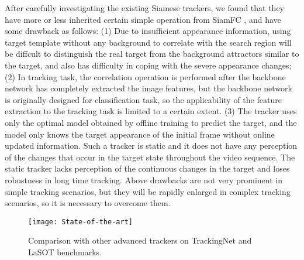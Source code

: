 \documentclass[letterpaper]{article} \usepackage{aaai23}  \usepackage{times}  \usepackage{helvet}  \usepackage{courier}  \usepackage[hyphens]{url}  \usepackage{graphicx} \urlstyle{rm} \def\UrlFont{\rm}  \usepackage{natbib}  \usepackage{caption} \frenchspacing  \setlength{\pdfpagewidth}{8.5in}  \setlength{\pdfpageheight}{11in}  \usepackage{algorithm}
\begin{document}
After carefully investigating the existing Siamese trackers, we found that they have more or less inherited certain simple operation from SiamFC \cite{simafc}, and have some drawback as follows: (1) Due to insufficient appearance information, using target template without any background to correlate with the search region will be diffcult to distinguish the real target from the background attractors similar to the target, and also has difficulty in coping with the severe appearance changes; (2) In tracking task, the correlation operation is performed after the backbone network has completely extracted the image features, but the backbone network is originally designed for classification task, so the applicability of the feature extraction to the tracking task is limited to a certain extent. (3) The tracker uses only the optimal model obtained by offline training to predict the target, and the model only knows the target appearance of the initial frame without online updated information. Such a tracker is static and it does not have any perception of the changes that occur in the target state throughout the video sequence. The static tracker lacks perception of the continuous changes in the target and loses robustness in long time tracking. Above drawbacks are not very prominent in simple tracking scenarios, but they will be rapidly enlarged in complex tracking scenarios, so it is necessary to overcome them.
\begin{figure}[t]
\texttt{[image: State-of-the-art]} \caption{Comparison with other advanced trackers on TrackingNet and LaSOT benchmarks.}
\label{fig0}
\end{figure}
\end{document}

